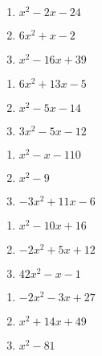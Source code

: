 \begin{exercise}
\begin{multicols}{3}	
\begin{enumerate}[series=decipher]
	\item
	  \(x^2-2x-24\)
	\item
	  \(6x^2+x-2\)
	\item
	  \(x^2-16x+39\)
\end{enumerate}
\end{multicols}
\vfill
\begin{multicols}{3}
\begin{enumerate}[resume=decipher]
	\item
	  \(6x^2+13x-5\)
	\item
	  \(x^2-5x-14\)
	\item
	  \(3x^2-5x-12\)
	\end{enumerate}
\end{multicols}
\vfill
\begin{multicols}{3}
\begin{enumerate}[resume=decipher] 
	\item
	  \(x^2-x-110\)
	\item
	  \(x^2-9\)
	\item
	\(-3x^2+11x-6\)
	\end{enumerate}
\end{multicols}
\vfill
\begin{multicols}{3}
\begin{enumerate}[resume=decipher]
	\item
	  \(x^2-10x+16\)
	  \item
	  \(-2x^2+5x+12\)
	\item
	  \(42x^2-x-1\)
	\end{enumerate}
\end{multicols}
\vfill
\begin{multicols}{3}
\begin{enumerate}[resume=decipher]	
	  \item
	  \(-2x^2-3x+27\)
	\item
	  \(x^2+14x+49\)
	\item
	  \(x^2-81\)
	\end{enumerate}
\end{multicols}
\end{exercise}

